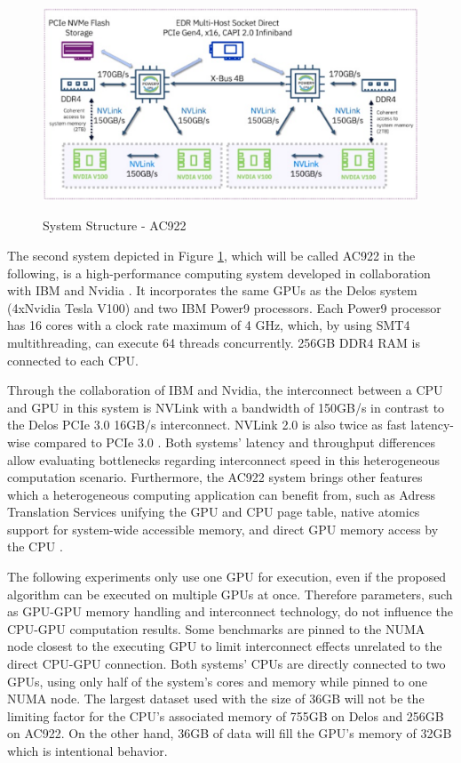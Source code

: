 \begin{figure}[H]
  \caption{System Structure - AC922 \cite{ganesannarayanasamyPowerAIDeepDive}}
  \includegraphics[width=\textwidth]{figures/ac922_system_arch.png}
  \centering
  \label{fig:ac922_arch}
\end{figure}

The second system depicted in Figure \ref{fig:ac922_arch}, which will be called AC922 in the following, is a high-performance computing system developed in collaboration with IBM and Nvidia \cite{caldeiraIBMPowerSystem}. It incorporates the same GPUs as the Delos system (4xNvidia Tesla V100) and two IBM Power9 processors. Each Power9 processor has 16 cores with a clock rate maximum of 4 GHz, which, by using SMT4 multithreading, can execute 64 threads concurrently. 256GB DDR4 RAM is connected to each CPU.

Through the collaboration of IBM and Nvidia, the interconnect between a CPU and GPU in this system is NVLink \cite{NVLink2021, zargesEvaluationOnNodeGPU} with a bandwidth of 150GB/s in contrast to the Delos PCIe 3.0 16GB/s interconnect. NVLink 2.0 is also twice as fast latency-wise compared to PCIe 3.0 \cite{liEvaluatingModernGPU2020}. Both systems' latency and throughput differences allow evaluating bottlenecks regarding interconnect speed in this heterogeneous computation scenario.
Furthermore, the AC922 system brings other features which a heterogeneous computing application can benefit from, such as Adress Translation Services \cite{ibmpower9nputeamFunctionalityPerformanceNVLink2018} unifying the GPU and CPU page table, native atomics support for system-wide accessible memory, and direct GPU memory access by the CPU \cite{UNIFIEDMEMORYP9}.

The following experiments only use one GPU for execution, even if the proposed algorithm can be executed on multiple GPUs at once. Therefore parameters, such as GPU-GPU memory handling and interconnect technology, do not influence the CPU-GPU computation results. Some benchmarks are pinned to the NUMA node closest to the executing GPU to limit interconnect effects unrelated to the direct CPU-GPU connection. Both systems' CPUs are directly connected to two GPUs, using only half of the system's cores and memory while pinned to one NUMA node. The largest dataset used with the size of 36GB will not be the limiting factor for the CPU's associated memory of 755GB on Delos and 256GB on AC922. On the other hand, 36GB of data will fill the GPU's memory of 32GB which is intentional behavior.

